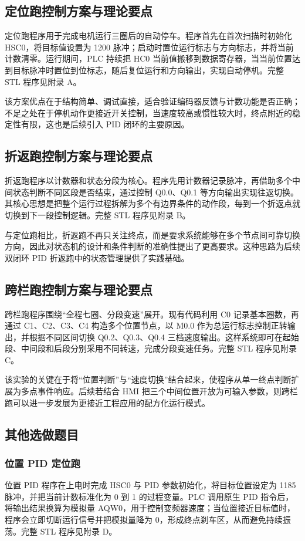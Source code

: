 \documentclass[12pt,a4paper]{ctexart}
\begin{document}
\subsection{定位跑控制方案与理论要点}
定位跑程序用于完成电机运行三圈后的自动停车。程序首先在首次扫描时初始化 HSC0，将目标值设置为 1200 脉冲；启动时置位运行标志与方向标志，并将当前计数清零。运行期间，PLC 持续把 HC0 当前值搬移到数据寄存器，当当前位置达到目标脉冲时置位到位标志，随后复位运行和方向输出，实现自动停机。完整 STL 程序见附录 A。

该方案优点在于结构简单、调试直接，适合验证编码器反馈与计数功能是否正确；不足之处在于停机动作更接近开关控制，当速度较高或惯性较大时，终点附近的稳定性有限，这也是后续引入 PID 闭环的主要原因。

\subsection{折返跑控制方案与理论要点}
折返跑程序以计数器和状态分段为核心。程序先用计数器记录脉冲，再借助多个中间状态判断不同区段是否结束，通过控制 Q0.0、Q0.1 等方向输出实现往返切换。其核心思想是把整个运行过程拆解为多个有边界条件的动作段，每到一个折返点就切换到下一段控制逻辑。完整 STL 程序见附录 B。

与定位跑相比，折返跑不再只关注终点，而是要求系统能够在多个节点间可靠切换方向，因此对状态机的设计和条件判断的准确性提出了更高要求。这种思路为后续双闭环 PID 折返跑中的状态管理提供了实践基础。

\subsection{跨栏跑控制方案与理论要点}
跨栏跑程序围绕“全程七圈、分段变速”展开。现有代码利用 C0 记录基本圈数，再通过 C1、C2、C3、C4 构造多个位置节点，以 M0.0 作为总运行标志控制正转输出，并根据不同区间切换 Q0.2、Q0.3、Q0.4 三档速度输出。这样系统即可在起始段、中间段和后段分别采用不同转速，完成分段变速任务。完整 STL 程序见附录 C。

该实验的关键在于将“位置判断”与“速度切换”结合起来，使程序从单一终点判断扩展为多点事件响应。后续若结合 HMI 把三个中间位置开放为可输入参数，则跨栏跑可以进一步发展为更接近工程应用的配方化运行模式。

\subsection{其他选做题目}

\subsubsection{位置 PID 定位跑}
位置 PID 程序在上电时完成 HSC0 与 PID 参数初始化，将目标位置设定为 1185 脉冲，并把当前计数标准化为 0 到 1 的过程变量。PLC 调用原生 PID 指令后，将输出结果换算为模拟量 AQW0，用于控制变频器速度；当位置接近目标值时，程序会立即切断运行信号并把模拟量降为 0，形成终点刹车区，从而避免持续振荡。完整 STL 程序见附录 D。
\end{document}
